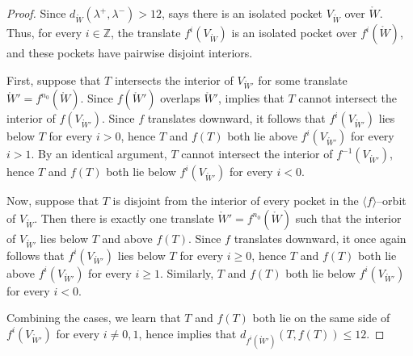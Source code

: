 \documentclass[11pt,letterpaper]{amsart}
\newcommand{\ZZ}[0]{\mathbb{Z}}
\newcommand{\mr}{\mathring}
\newcommand{\psub}{\mr W}
\numberwithin{equation}{section}
\theoremstyle{definition}
\begin{document}
\begin{proof}
Since $d_{\psub}(\lambda^+,\lambda^-) > 12$,  says there is an isolated pocket $V_{\psub}$ over $\psub$. Thus, for every $i \in \ZZ$, the translate $f^i(V_{\psub})$ is an isolated pocket over $f^i(\psub)$, and these pockets have pairwise disjoint interiors. 


First, suppose that $T$ intersects the interior of $V_{\psub'}$ for some translate $\psub' = f^{n_0}(\psub)$.
Since $f(\psub')$ overlaps $\psub'$,   implies that  $T$ cannot intersect the interior of $f(V_{\psub'})$. Since $f$ translates downward, it follows that $f^i(V_{\psub'})$ lies below $T$ for every $i > 0$, hence $T$ and $f(T)$ both lie above $f^i(V_{\psub'})$ for every $i > 1$. By an identical argument, $T$ cannot intersect the  interior of $f^{-1}(V_{\psub'})$, hence $T$ and $f(T)$ both lie below $f^i(V_{\psub'})$ for every $i < 0$. 

Now, suppose that $T$ is disjoint from the interior of every pocket in the $\langle f \rangle$--orbit of $V_{\psub}$. 
Then there is exactly one translate $\psub' = f^{n_0}(\psub)$
such that the interior of  $V_{\psub'}$ lies below $T$ and above $f(T)$. Since $f$ translates downward, it once again follows that $f^i(V_{\psub'})$ lies below $T$ for every $i \geq 0$,  hence $T$ and $f(T)$ both lie above $f^i(V_{\psub'})$ for every $i \geq 1$. Similarly,   $T$ and $f(T)$ both lie below $f^i(V_{\psub'})$ for every $i < 0$. 

Combining the cases, we learn that $T$ and  $f(T)$ both lie on the same side of $f^i(V_{\psub'})$ for every $i \neq 0,1$, hence   implies that $d_{f^i(\psub')}(T, f(T)) \leq 12$.




\end{proof}
\end{document}
